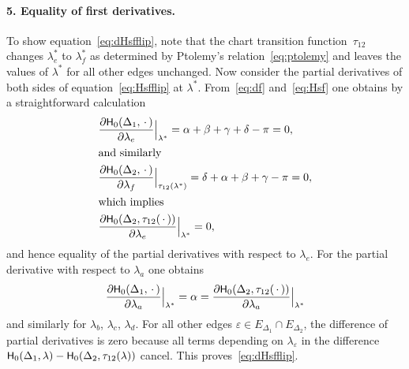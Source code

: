 \documentclass[a4paper, 11pt]{article}
\newcommand{\Hsf}{\scalebox{0.94}{$\mathsf{H}$}}
\theoremstyle{plain}
\theoremstyle{definition}
\begin{document}
\paragraph{5. Equality of first derivatives.} To show
equation~\eqref{eq:dHsfflip}, note that the chart transition
function~$\tau_{12}$ changes $\lambda^{*}_{e}$ to
$\lambda^{*}_{f}$ as determined by Ptolemy's
relation~\eqref{eq:ptolemy} and leaves the values of $\lambda^{*}$ for
all other edges unchanged. Now consider the partial derivatives of
both sides of equation~\eqref{eq:Hsfflip} at
$\lambda^{*}$. From~\eqref{eq:df} and~\eqref{eq:Hsf} one obtains by a
straightforward calculation
\begin{align}
  &\frac{\partial\Hsf_{0}(\Delta_{1},\,\cdot\,)}{\partial \lambda_{e}}
    \Big|_{\lambda^{*}}
    ={\alpha}+{\beta}+{\gamma}+{\delta}-\pi=0,\\
  \intertext{and similarly}
  \label{eq:dH0dlambdaf}
  &\frac{\partial\Hsf_{0}(\Delta_{2},\,\cdot\,)}{\partial \lambda_{f}}
    \Big|_{\tau_{12}(\lambda^{*})}
    =\delta+\alpha+\beta+\gamma-\pi=0,\\
  \intertext{which implies}
  &\frac{\partial\Hsf_{0}(\Delta_{2},\tau_{12}(\,\cdot\,))}{\partial
    \lambda_{e}}
    \Big|_{\lambda^{*}}
    =0,
\end{align}
and hence equality of the partial derivatives with respect to
$\lambda_{e}$. For the partial derivative with respect to $\lambda_{a}$ one obtains
\begin{equation}
  \frac{\partial\Hsf_{0}(\Delta_{1},\,\cdot\,)}{\partial \lambda_{a}}
  \Big|_{\lambda^{*}}
  =\alpha
  =\frac{\partial\Hsf_{0}(\Delta_{2},\tau_{12}(\,\cdot\,))}{\partial
    \lambda_{a}}
  \Big|_{\lambda^{*}}
\end{equation}
and similarly for $\lambda_{b}$, $\lambda_{c}$, $\lambda_{d}$. For all other edges
$\varepsilon\in E_{\Delta_{1}}\cap E_{\Delta_{2}}$, the difference of
partial derivatives is zero because all terms depending on
$\lambda_{\varepsilon}$ in the difference
$\Hsf_{0}(\Delta_{1},\lambda)
-\Hsf_{0}(\Delta_{2},\tau_{12}(\lambda))$ cancel. This
proves~\eqref{eq:dHsfflip}.
\end{document}
